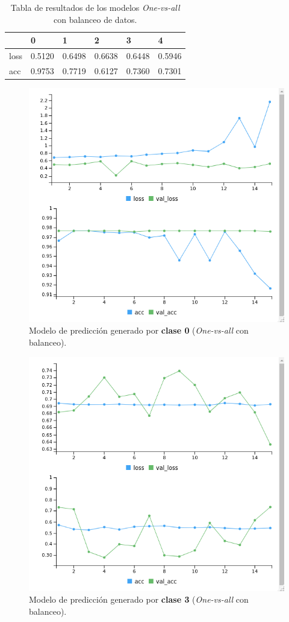 \documentclass[]{article}
\begin{document}
		\begin{table}[h]
			\centering
			\begin{tabular}{llllll}
				     & 0      & 1      & 2      & 3      & 4      \\ \hline
				loss & 0.5120 & 0.6498 & 0.6638 & 0.6448 & 0.5946 \\
				acc  & 0.9753 & 0.7719 & 0.6127 & 0.7360 & 0.7301
			\end{tabular}%
			\caption{Tabla de resultados de los modelos \textit{One-vs-all} con balanceo de datos.}
			\label{ova-con-balanceo}
		\end{table}
	
		\begin{figure}[h]
			\centering
			\includegraphics[width=0.6\columnwidth]{./img/OVA_bal_0}
			\caption{Modelo de predicción generado por \textbf{clase 0} (\textit{One-vs-all} con balanceo).}
			\label{ova-bal-0}
		\end{figure}
		
		\begin{figure}[h]
			\centering
			\includegraphics[width=0.6\columnwidth]{./img/OVA_bal_3}
			\caption{Modelo de predicción generado por \textbf{clase 3} (\textit{One-vs-all} con balanceo).}
			\label{ova-bal-3}
		\end{figure}
		
\end{document}
